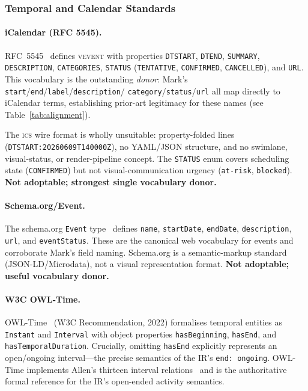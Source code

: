 \subsubsection{Temporal and Calendar Standards}

\paragraph{iCalendar (RFC 5545).}
RFC~5545~\cite{ical-rfc5545} defines \textsc{vevent} with properties
\texttt{DTSTART}, \texttt{DTEND}, \texttt{SUMMARY}, \texttt{DESCRIPTION},
\texttt{CATEGORIES}, \texttt{STATUS} (\texttt{TENTATIVE}, \texttt{CONFIRMED},
\texttt{CANCELLED}), and \texttt{URL}. This vocabulary is the outstanding
\emph{donor}: Mark's \texttt{start}/\texttt{end}/\texttt{label}/\texttt{description}/
\texttt{category}/\texttt{status}/\texttt{url} all map directly to iCalendar
terms, establishing prior-art legitimacy for these names
(see Table~\ref{tab:alignment}).

The \textsc{ics} wire format is wholly unsuitable: property-folded lines
(\texttt{DTSTART:20260609T140000Z}), no YAML/JSON structure, and no swimlane,
visual-status, or render-pipeline concept. The \texttt{STATUS} enum covers
scheduling state (\texttt{CONFIRMED}) but not visual-communication urgency
(\texttt{at-risk}, \texttt{blocked}). \textbf{Not adoptable; strongest single
vocabulary donor.}

\paragraph{Schema.org/Event.}
The schema.org \texttt{Event} type~\cite{schemaorg-event} defines
\texttt{name}, \texttt{startDate}, \texttt{endDate}, \texttt{description},
\texttt{url}, and \texttt{eventStatus}. These are the canonical web vocabulary
for events and corroborate Mark's field naming. Schema.org is a
semantic-markup standard (JSON-LD/Microdata), not a visual representation
format. \textbf{Not adoptable; useful vocabulary donor.}

\paragraph{W3C OWL-Time.}
OWL-Time~\cite{owltime} (W3C Recommendation, 2022) formalises temporal
entities as \texttt{Instant} and \texttt{Interval} with object properties
\texttt{hasBeginning}, \texttt{hasEnd}, and \texttt{hasTemporalDuration}.
Crucially, omitting \texttt{hasEnd} explicitly represents an open/ongoing
interval---the precise semantics of the IR's \texttt{end: ongoing}. OWL-Time
implements Allen's thirteen interval relations~\cite{allen1983} and is the
authoritative formal reference for the IR's open-ended activity semantics.

